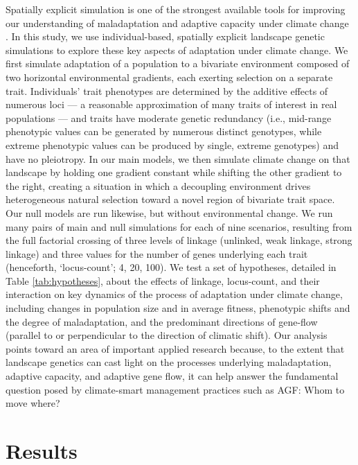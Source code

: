 \documentclass[9pt,twocolumn,twoside,lineno]{pnas-new}
\begin{document}
Spatially explicit simulation is one of the strongest available tools
for improving our understanding of maladaptation and adaptive capacity
under climate change \cite{capblancq_review}.
In this study, we use individual-based, spatially explicit landscape genetic simulations to
explore these key aspects of adaptation under climate change. We first simulate 
adaptation of a population to a bivariate environment composed of two horizontal 
environmental gradients, each exerting selection on a separate trait.
Individuals' trait phenotypes are determined by the additive effects of numerous loci ---
a reasonable approximation of many traits of interest in real populations \cite{sella} ---
and traits have moderate genetic redundancy 
(i.e., mid-range phenotypic values
can be generated by numerous distinct genotypes, while extreme phenotypic
values can be produced by single, extreme genotypes) and have no pleiotropy.
In our main models, we then simulate climate change on that landscape by holding one gradient 
constant while shifting the other gradient to the right, creating a situation in which
a decoupling environment drives heterogeneous natural selection toward a novel region 
of bivariate trait space. Our null models are run likewise, but without environmental 
change. We run many pairs of main and null simulations for each of nine scenarios, 
resulting from the full factorial crossing of three levels of linkage (unlinked, weak 
linkage, strong linkage) and three values for the number of genes underlying each 
trait (henceforth, ‘locus-count’; 4, 20, 100). We test a set of hypotheses, detailed 
in Table \ref{tab:hypotheses}, about the effects of linkage,
locus-count, and their interaction on key 
dynamics of the process of adaptation under climate change, including changes in 
population size and in average fitness, phenotypic shifts and the degree of 
maladaptation, and the predominant directions of gene-flow (parallel to or 
perpendicular to the direction of climatic shift). Our analysis points toward an area 
of important applied research because, to the extent that landscape genetics can cast 
light on the processes underlying maladaptation, adaptive capacity, and adaptive gene
flow, it can help answer the fundamental question posed by climate-smart management 
practices such as AGF: Whom to move where?


\section*{Results}
\end{document}
